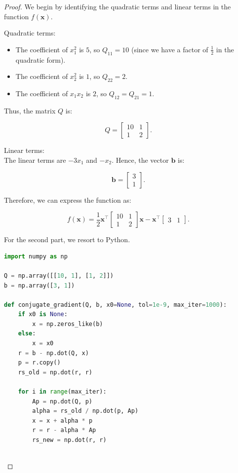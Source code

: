 \documentclass{article}
\begin{document}
\begin{proof}
We begin by identifying the quadratic terms and linear terms in the function \( f(\mathbf{x}) \).

Quadratic terms: \\
\begin{itemize}
\item The coefficient of \( x_1^2 \) is \( 5 \), so \( Q_{11} = 10 \) (since we have a factor of \( \frac{1}{2} \) in the quadratic form).
\item The coefficient of \( x_2^2 \) is \( 1 \), so \( Q_{22} = 2 \).
\item The coefficient of \( x_1 x_2 \) is \( 2 \), so \( Q_{12} = Q_{21} = 1 \).
\end{itemize}

Thus, the matrix \( Q \) is:

\[
Q = \begin{bmatrix} 10 & 1 \\ 1 & 2 \end{bmatrix}.
\]

Linear terms: \\
The linear terms are \( -3x_1 \) and \( -x_2 \). Hence, the vector \( \mathbf{b} \) is:

\[
\mathbf{b} = \begin{bmatrix} 3 \\ 1 \end{bmatrix}.
\]

Therefore, we can express the function as:

\[
f(\mathbf{x}) = \frac{1}{2} \mathbf{x}^\top \begin{bmatrix} 10 & 1 \\ 1 & 2 \end{bmatrix} \mathbf{x} - \mathbf{x}^\top \begin{bmatrix} 3 & 1 \end{bmatrix}.
\]

For the second part, we resort to Python.

\begin{lstlisting}[language=Python]
import numpy as np

Q = np.array([[10, 1], [1, 2]])
b = np.array([3, 1])

def conjugate_gradient(Q, b, x0=None, tol=1e-9, max_iter=1000):
    if x0 is None:
        x = np.zeros_like(b)  
    else:
        x = x0
    r = b - np.dot(Q, x)  
    p = r.copy()  
    rs_old = np.dot(r, r)
    
    for i in range(max_iter):
        Ap = np.dot(Q, p)
        alpha = rs_old / np.dot(p, Ap)
        x = x + alpha * p
        r = r - alpha * Ap
        rs_new = np.dot(r, r)
        

\end{lstlisting}
\end{proof}
\end{document}
